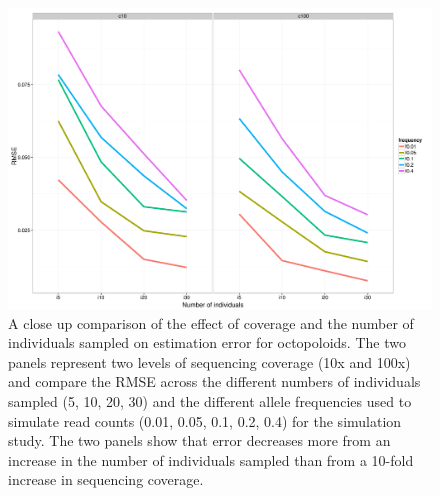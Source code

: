 \documentclass[]{article}
\begin{document}
\begin{figure}[b]
\centering
\caption{A close up comparison of the effect of coverage and the number of individuals sampled on estimation error for octopoloids. The two panels represent two levels of sequencing coverage (10x and 100x) and compare the RMSE across the different numbers of individuals sampled (5, 10, 20, 30) and the different allele frequencies used to simulate read counts (0.01, 0.05, 0.1, 0.2, 0.4) for the simulation study. The two panels show that error decreases more from an increase in the number of individuals sampled than from a 10-fold increase in sequencing coverage.}
\includegraphics[width=\textwidth]{pdf/figS4}
\end{figure}
\end{document}
